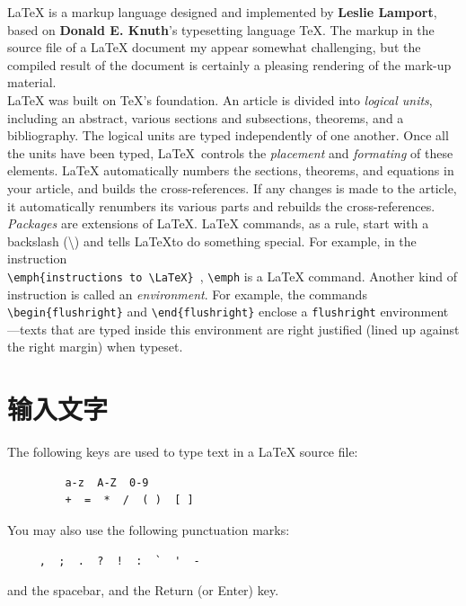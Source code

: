 \LaTeX \; is a markup language designed and implemented by \textbf{Leslie Lamport}, based on \textbf{Donald E. Knuth}'s typesetting language \TeX.  The markup in the source file of a \LaTeX \; document my appear somewhat challenging, but the compiled result of the document is certainly a pleasing rendering of the mark-up material.\\

\LaTeX \; was built on \TeX 's foundation.  An article is divided into \emph{logical units}, including an abstract, various sections and subsections, theorems, and a bibliography.  The logical units are typed independently of one another.  Once all the units have been typed, \LaTeX \, controls the \emph{placement} and \emph{formating} of these elements. \LaTeX \; automatically numbers the sections, theorems, and equations in your article, and builds the cross-references.  If any changes is made to the article, it automatically renumbers its various parts and rebuilds the cross-references.\\

\emph{Packages} are extensions of \LaTeX.  \LaTeX \; commands, as a rule, start with a backslash (\textbackslash) and tells \LaTeX  to do something special. For example, in the instruction\\
\verb+\emph{instructions to \LaTeX} +, \verb+\emph+ is a \LaTeX \; command. Another kind of instruction is called an \emph{environment}. For example, the commands \verb+\begin{flushright}+ and \verb+\end{flushright}+ enclose a \verb+flushright+ environment---texts that are typed inside this environment are right justified (lined up against the right margin) when typeset.

\section{输入文字}
The following keys are used to type text in a \LaTeX \; source file:
\begin{center}
   \begin{verbatim}
         a-z  A-Z  0-9
         +  =  *  /  ( )  [ ]
   \end{verbatim}
\end{center}
You may also use the following punctuation marks:
\begin{center}
   \begin{verbatim}
     ,  ;  .  ?  !  :  `  '  -
   \end{verbatim}
\end{center}
and the spacebar, and the Return (or Enter) key.\\

